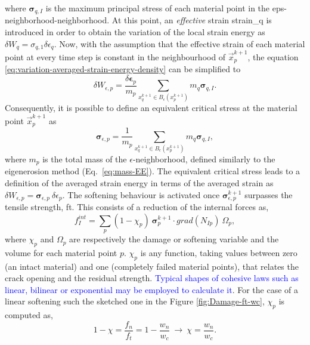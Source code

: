 \documentclass[preprint,12pt,a4paper]{elsarticle}
\newcommand{\tens}[1]{
  \ensuremath{\mathbf{{#1}}}
}
\newcommand\Grad[1]{grad({#1})}
\begin{document}
where $\tens{\sigma}_{q,I}$ is the maximum principal stress of each
material point in the \gls{eps-neighborhood}-neighborhood. At this point, an \textit{effective} strain \gls{strain_q} is introduced in order to obtain the variation of
the local strain energy as $\delta W_q = \sigma_{q,1}
\delta\epsilon_q$. Now, with the assumption that the effective
strain of each material point at every time step is constant in the
neighbourhood of $\vec{x}_p^{k+1}$, the equation 
\eqref{eq:variation-averaged-strain-energy-density} can be simplified
 to
\begin{equation}
  \label{eq:variation-averaged-strain-energy-density-simpli}
  \delta W_{\epsilon,p} =
  \frac{\delta\tens{\epsilon}_p}{m_p} \sum_{x_q^{k+1} \in
  B_{\epsilon}(x_p^{k+1})} m_q \tens{\sigma}_{q,I}. 
\end{equation}
Consequently, it is possible to define an equivalent critical stress at the
material point $\vec{x}_p^{k+1}$ as
\begin{equation}
  \label{eq:equivalent-critical-stress}
  \tens{\sigma}_{\epsilon,p} =
  \frac{1}{m_p} \sum_{x_q^{k+1} \in
  B_{\epsilon}(x_p^{k+1})} m_q \tens{\sigma}_{q,I}, 
\end{equation}
where $m_p$ is the total mass of the
$\epsilon$-neighborhood, defined similarly to the eigenerosion
  method (Eq.~\eqref{eq:mass-EE}). The equivalent critical stress
  leads to a definition of the   averaged strain energy in terms of the averaged
strain as $\delta W_{\epsilon,p} =
 \tens{\sigma}_{\epsilon,p}\ \delta\epsilon_p$. The softening behaviour is
activated once $\tens{\sigma}_{\epsilon,p}^{k+1}$ surpasses the
tensile strength, \gls{ft}. This consists of a reduction of the internal
forces as, 
 \begin{equation}
   \label{eq:f-int-damaged}
   f^{int}_I = \sum_p (1 - \chi_p)\ \tens{\sigma}_{p}^{k+1} \cdot
   \Grad{N_{Ip}}\ \Omega_p,
 \end{equation}
where $\chi_p$ and $\Omega_p$ are respectively the damage or softening
variable and the volume for each material point $p$. $\chi_p$ is any function, taking
values between zero (an intact material) and one (completely failed
material points), that relates the crack opening and the residual strength. \textcolor{blue}{Typical shapes of cohesive laws such as linear, bilinear or exponential may be employed to calculate it}. For the case of a linear softening such the sketched one in the Figure \ref{fig:Damage-ft-wc}, $\chi_p$ is computed as,
 \begin{equation}
   \label{eq:damaged-variable-chi}
   1 - \chi = \frac{f_n}{f_t} = 1 - \frac{w_n}{w_c}\ \rightarrow\ \chi
   = \frac{w_n}{w_c}.
 \end{equation}
\end{document}
